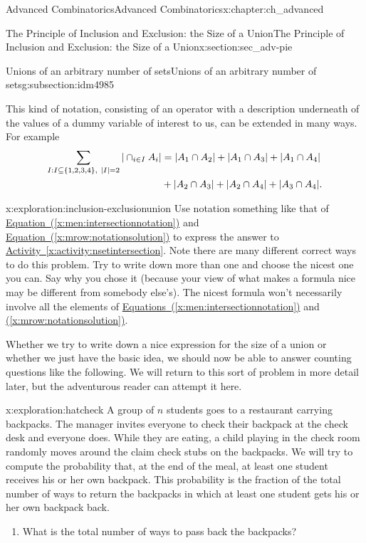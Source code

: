 \documentclass[oneside,10pt,]{book}
\numberwithin{equation}{chapter}
\newcommand{\amp}{&}
\begin{document}
\begin{chapterptx}{Advanced Combinatorics}{}{Advanced Combinatorics}{}{}{x:chapter:ch_advanced}
\begin{sectionptx}{The Principle of Inclusion and Exclusion: the Size of a Union}{}{The Principle of Inclusion and Exclusion: the Size of a Union}{}{}{x:section:sec_adv-pie}
\begin{subsectionptx}{Unions of an arbitrary number of sets}{}{Unions of an arbitrary number of sets}{}{}{g:subsection:idm4985}
%
\par
This kind of notation, consisting of an operator with a description underneath of the values of a dummy variable of interest to us, can be extended in many ways. For example%
\begin{align}
\sum_{I:I \subseteq \{1,2,3,4\}, \ |I|=2} |\cap_{i\in I}
A_i|  \amp =  |A_1\cap A_2|+ |A_1\cap A_3|
+|A_1\cap A_4|\notag\\
\amp +  |A_2\cap A_3|+
|A_2\cap A_4| +|A_3\cap A_4|.\label{x:mrow:notationsolution}
\end{align}
%
\begin{exploration}{}{x:exploration:inclusion-exclusionunion}%
Use notation something like that of \hyperref[x:men:intersectionnotation]{Equation~(\ref{x:men:intersectionnotation})} and \hyperref[x:mrow:notationsolution]{Equation~(\ref{x:mrow:notationsolution})} to express the answer to \hyperref[x:activity:nsetintersection]{Activity~\ref{x:activity:nsetintersection}}. Note there are many different correct ways to do this problem. Try to write down more than one and choose the nicest one you can. Say why you chose it (because your view of what makes a formula nice may be different from somebody else's). The nicest formula won't necessarily involve all the elements of \hyperref[x:men:intersectionnotation]{Equations~(\ref{x:men:intersectionnotation})} and \hyperref[x:mrow:notationsolution]{(\ref{x:mrow:notationsolution})}.%
\end{exploration}
Whether we try to write down a nice expression for the size of a union or whether we just have the basic idea, we should now be able to answer counting questions like the following.  We will return to this sort of problem in more detail later, but the adventurous reader can attempt it here.%
\begin{exploration}{}{x:exploration:hatcheck}%
A group of \(n\) students goes to a restaurant carrying backpacks. The manager invites everyone to check their backpack at the check desk and everyone does. While they are eating, a child playing in the check room randomly moves around the claim check stubs on the backpacks. We will try to compute the probability that, at the end of the meal, at least one student receives his or her own backpack.  This probability is the fraction of the total number of ways to return the backpacks in which at least one student gets his or her own backpack back.%
\begin{enumerate}[font=\bfseries,label=(\alph*),ref=\alph*]
\item{}What is the total number of ways to pass back the backpacks?%

\end{enumerate}
\end{exploration}
\end{subsectionptx}
\end{sectionptx}
\end{chapterptx}
\end{document}
